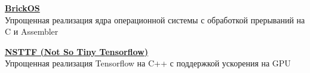 \documentclass[10pt, a4paper]{article}
\begin{document}
\begin{minipage}[t]{0.55\textwidth}
\vspace{0.5cm}

\hspace{0.5cm}
\begin{minipage}[t]{0.9\textwidth}
    \raggedright
    \textbf{\Large \href{https://github.com/B0GDANPN/BrickOS/tree/main}{BrickOS}\extlink}  \\[2pt]
    Упрощенная реализация ядра операционной системы с обработкой прерываний на C и Assembler\\
\end{minipage}

\vspace{0.5cm}

\hspace{0.5cm}
\begin{minipage}[t]{0.9\textwidth}
    \raggedright
    \textbf{\Large \href{https://github.com/VolkovK04/NSTTF}{NSTTF (Not So Tiny Tensorflow)}\extlink}  \\[2pt]
    Упрощенная реализация Tensorflow на C++ с поддержкой ускорения на GPU \\
\end{minipage}

\vspace{0.5cm}



\end{minipage}%
\hfill %
\end{document}
